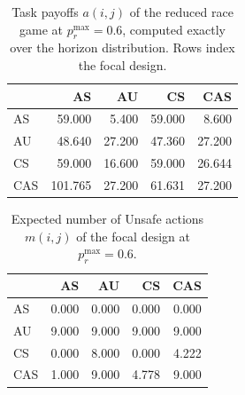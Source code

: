 \begin{table}[htbp]
\centering
\caption{Task payoffs $a(i,j)$ of the reduced race game at $p_r^{\max}=0.6$, computed exactly over the horizon distribution. Rows index the focal design.}
\label{tab:payoff}
\begin{tabular}{lrrrr}
\toprule
 & AS & AU & CS & CAS \\
\midrule
AS & 59.000 & 5.400 & 59.000 & 8.600 \\
AU & 48.640 & 27.200 & 47.360 & 27.200 \\
CS & 59.000 & 16.600 & 59.000 & 26.644 \\
CAS & 101.765 & 27.200 & 61.631 & 27.200 \\
\bottomrule
\end{tabular}
\end{table}
\begin{table}[htbp]
\centering
\caption{Expected number of Unsafe actions $m(i,j)$ of the focal design at $p_r^{\max}=0.6$.}
\label{tab:unsafe-count}
\begin{tabular}{lrrrr}
\toprule
 & AS & AU & CS & CAS \\
\midrule
AS & 0.000 & 0.000 & 0.000 & 0.000 \\
AU & 9.000 & 9.000 & 9.000 & 9.000 \\
CS & 0.000 & 8.000 & 0.000 & 4.222 \\
CAS & 1.000 & 9.000 & 4.778 & 9.000 \\
\bottomrule
\end{tabular}
\end{table}
